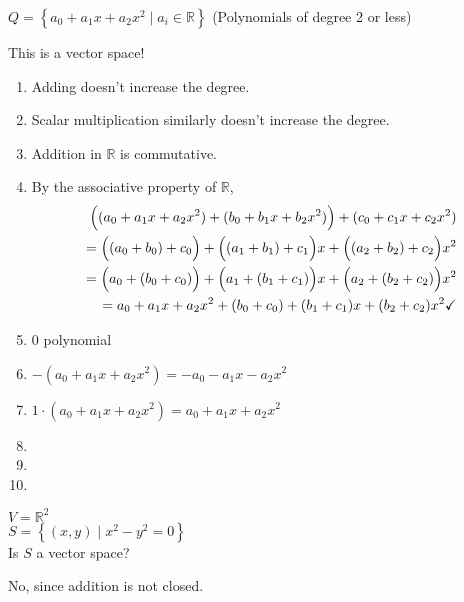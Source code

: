 \documentclass[../main.tex]{subfiles}
\begin{document}
\begin{example}[]
    \( Q = \left\{ a_0 + a_1 x + a_2 x^2 \mid a_i \in \mathbb{R} \right\} \)
    (Polynomials of degree 2 or less)
    
    This is a vector space!
    \begin{enumerate}[label=A\arabic*.]
        \item Adding doesn't increase the degree. \checkmark
        \item Scalar multiplication similarly doesn't increase the degree. \checkmark
        \item Addition in \( \mathbb{R} \) is commutative. \checkmark
        \item By the associative property of \( \mathbb{R} \),
        \begin{align*}
            \Bigl( (a_0 + a_1 x + a_2 x^2) + (b_0 + b_1 x + b_2 x^2) \Bigr) + (c_0 + c_1 x + c_2 x^2) \\
            = \Bigl( (a_0 + b_0) + c_0 \Bigr) + \Bigl( (a_1 + b_1) + c_1 \Bigr)x + \Bigl( (a_2 + b_2) + c_2 \Bigr)x^2 \\
            = \Bigl( a_0 + (b_0 + c_0) \Bigr) + \Bigl( a_1 + (b_1 + c_1) \Bigr)x + \Bigl( a_2 + (b_2 + c_2) \Bigr)x^2 \\
            = a_0 + a_1 x + a_2 x^2 + (b_0 + c_0) + (b_1 + c_1)x + (b_2 + c_2)x^2 \checkmark
        \end{align*}
        \item 0 polynomial \checkmark
        \item \( -(a_0 + a_1 x + a_2 x^2) = -a_0 - a_1x - a_2x^2 \) \checkmark
        \item \( 1\cdot(a_0 + a_1 x + a_2 x^2) = a_0 + a_1 x + a_2 x^2 \) \checkmark
        \item \checkmark
        \item \checkmark
        \item \checkmark
    \end{enumerate}
\end{example}

\begin{example}
    \( V = \mathbb{R}^2 \) \\
    \( S = \left\{ (x,y) \mid x^2-y^2 = 0 \right\} \) \\
    Is \( S \) a vector space?

    No, since addition is not closed.
\end{example}
\end{document}
